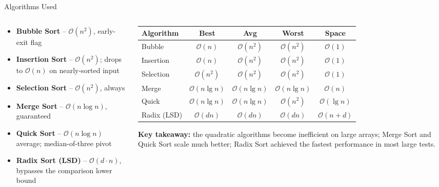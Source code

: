 \documentclass[aspectratio=169]{beamer}
\begin{document}
\begin{frame}{Algorithms Used}
  \begin{columns}[T]
    \begin{column}{0.46\textwidth}
      \begin{itemize}
        \item \textbf{Bubble Sort} -- $\mathcal{O}(n^2)$, early-exit flag
        \item \textbf{Insertion Sort} -- $\mathcal{O}(n^2)$; drops to $\mathcal{O}(n)$
              on nearly-sorted input
        \item \textbf{Selection Sort} -- $\mathcal{O}(n^2)$, always
        \item \textbf{Merge Sort} -- $\mathcal{O}(n \log n)$, guaranteed
        \item \textbf{Quick Sort} -- $\mathcal{O}(n \log n)$ average;
              median-of-three pivot
        \item \textbf{Radix Sort (LSD)} -- $\mathcal{O}(d \cdot n)$,
              bypasses the comparison lower bound
      \end{itemize}
    \end{column}
    \begin{column}{0.52\textwidth}
      \centering
      \footnotesize
      \setlength{\tabcolsep}{3pt}
      \begin{tabular}{lcccc}
        \toprule
        \textbf{Algorithm} & \textbf{Best} & \textbf{Avg} & \textbf{Worst} & \textbf{Space} \\
        \midrule
        Bubble       & $\mathcal{O}(n)$       & $\mathcal{O}(n^2)$      & $\mathcal{O}(n^2)$      & $\mathcal{O}(1)$ \\
        Insertion    & $\mathcal{O}(n)$       & $\mathcal{O}(n^2)$      & $\mathcal{O}(n^2)$      & $\mathcal{O}(1)$ \\
        Selection    & $\mathcal{O}(n^2)$     & $\mathcal{O}(n^2)$      & $\mathcal{O}(n^2)$      & $\mathcal{O}(1)$ \\
        Merge        & $\mathcal{O}(n\lg n)$  & $\mathcal{O}(n \lg n)$  & $\mathcal{O}(n \lg n)$  & $\mathcal{O}(n)$ \\
        Quick        & $\mathcal{O}(n\lg n)$  & $\mathcal{O}(n \lg n)$  & $\mathcal{O}(n^2)$      & $\mathcal{O}(\lg n)$ \\
        Radix (LSD)  & $\mathcal{O}(dn)$      & $\mathcal{O}(dn)$       & $\mathcal{O}(dn)$       & $\mathcal{O}(n{+}d)$ \\
        \bottomrule
      \end{tabular}
      \vspace{0.5em}

      \textbf{Key takeaway:} the quadratic algorithms become inefficient on large
      arrays; Merge Sort and Quick Sort scale much better; Radix Sort achieved the
      fastest performance in most large tests.
    \end{column}
  \end{columns}
\end{frame}
\end{document}
